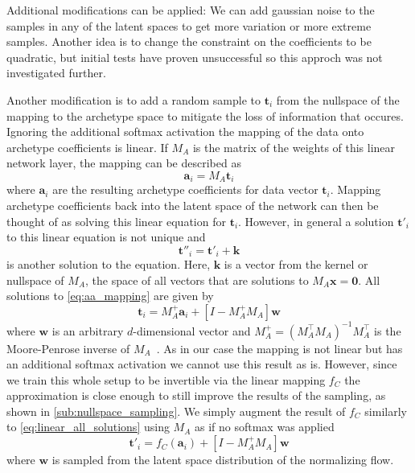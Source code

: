 Additional modifications can be applied: We can add gaussian noise to the
samples in any of the latent spaces to get more variation or more extreme
samples. Another idea is to change the constraint on the coefficients to be
quadratic, but initial tests have proven unsuccessful so this approch was not
investigated further.

Another modification is to add a random sample to $\mathbf{t}_i$ from the
nullspace of the mapping to the archetype space to mitigate the loss of
information that occures. Ignoring the additional softmax activation the
mapping of the data onto archetype coefficients is linear. If $M_A$ is the
matrix of the weights of this linear network layer, the mapping can be
described as
\begin{equation}%
	\label{eq:aa_mapping}
	\mathbf{a}_i = M_A \mathbf{t}_i
\end{equation}
where $\mathbf{a}_i$ are the resulting archetype coefficients for data vector
$\mathbf{t}_i$. Mapping archetype coefficients back into the latent space of
the network can then be thought of as solving this linear equation for
$\mathbf{t}_i$. However, in general a solution $\mathbf{t}'_i$ to this linear
equation is not unique and
\begin{equation}
	\mathbf{t}''_i = \mathbf{t}'_i + \mathbf{k}
\end{equation}
is another solution to the equation. Here, $\mathbf{k}$ is a vector from the
kernel or nullspace of $M_A$, the space of all vectors that are solutions to
$M_A \mathbf{x} = \mathbf{0}$. All solutions to \autoref{eq:aa_mapping} are
given by
\begin{equation}%
	\label{eq:linear_all_solutions}
	\mathbf{t}_i = M_A^+ \mathbf{a}_i + [I - M_A^+ M_A] \mathbf{w}
\end{equation}
where $\mathbf{w}$ is an arbitrary $d$-dimensional vector and $M_A^+ =
	(M_A^\top M_A)^{-1} M_A^\top$ is the Moore-Penrose inverse of
$M_A$~\citep{jamesGeneralisedInverse1978}. As in our case the mapping is not
linear but has an additional softmax activation we cannot use this result as
is. However, since we train this whole setup to be invertible via the linear
mapping $f_C$ the approximation is close enough to still improve the results of
the sampling, as shown in \autoref{sub:nullspace_sampling}. We simply augment
the result of $f_C$ similarly to \autoref{eq:linear_all_solutions} using $M_A$
as if no softmax was applied
\begin{equation}%
	\label{eq:augmented_t}
	\mathbf{t}'_i = f_C(\mathbf{a}_i) + [I - M_A^+ M_A] \mathbf{w}
\end{equation}
where $\mathbf{w}$ is sampled from the latent space distribution of the
normalizing flow.

